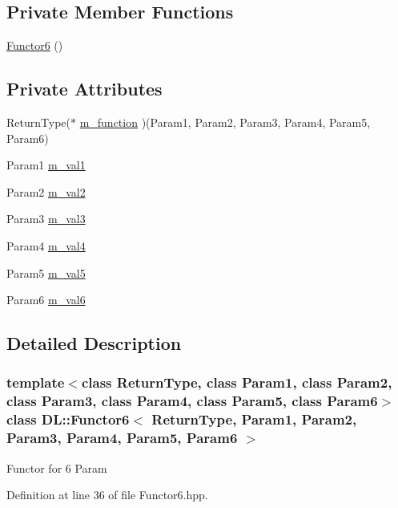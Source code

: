\subsection*{Private Member Functions}
\begin{CompactItemize}
\item 
\hyperlink{classDL_1_1Functor6_d0}{Functor6} ()
\end{CompactItemize}
\subsection*{Private Attributes}
\begin{CompactItemize}
\item 
Return\-Type($\ast$ \hyperlink{classDL_1_1Functor6_r0}{m\_\-function} )(Param1, Param2, Param3, Param4, Param5, Param6)
\item 
Param1 \hyperlink{classDL_1_1Functor6_r1}{m\_\-val1}
\item 
Param2 \hyperlink{classDL_1_1Functor6_r2}{m\_\-val2}
\item 
Param3 \hyperlink{classDL_1_1Functor6_r3}{m\_\-val3}
\item 
Param4 \hyperlink{classDL_1_1Functor6_r4}{m\_\-val4}
\item 
Param5 \hyperlink{classDL_1_1Functor6_r5}{m\_\-val5}
\item 
Param6 \hyperlink{classDL_1_1Functor6_r6}{m\_\-val6}
\end{CompactItemize}


\subsection{Detailed Description}
\subsubsection*{template$<$class Return\-Type, class Param1, class Param2, class Param3, class Param4, class Param5, class Param6$>$ class DL::Functor6$<$ Return\-Type, Param1, Param2, Param3, Param4, Param5, Param6 $>$}

Functor for 6 Param



Definition at line 36 of file Functor6.hpp.

